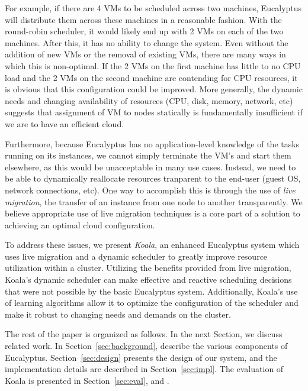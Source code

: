 For example, if there are 4 VMs to be scheduled across two machines, Eucalyptus will distribute them across these machines in a reasonable fashion.  With the round-robin scheduler, it would likely end up with 2 VMs on each of the two machines.  After this, it has no ability to change the system.  Even without the addition of new VMs or the removal of existing VMs, there are many ways in which this is non-optimal.  If the 2 VMs on the first machine has little to no CPU load and the 2 VMs on the second machine are contending for CPU resources, it is obvious that this configuration could be improved.  More generally, the dynamic needs and changing availability of resources (CPU, disk, memory, network, etc) suggests that assignment of VM to nodes statically is fundamentally insufficient if we are to have an efficient cloud.

Furthermore, because Eucalyptus has no application-level knowledge of the tasks running on its instances, we cannot simply terminate the VM's and start them elsewhere, as this would be unacceptable in many use cases.  Instead, we need to be able to dynamically reallocate resources tranparent to the end-user (guest OS, network connections, etc).  One way to accomplish this is through the use of \emph{live migration}, the transfer of an instance from one node to another transparently.  We believe appropriate use of live migration techniques is a core part of a solution to achieving an optimal cloud configuration.


To address these issues, we present \emph{Koala}, an enhanced Eucalyptus system which uses live migration and a dynamic scheduler to greatly improve resource utilization within a cluster.  Utilizing the benefits provided from live migration, Koala's dynamic scheduler can make effective and reactive scheduling decisions that were not possible by the basic Eucalyptus system.  Additionally, Koala's use of learning algorithms allow it to optimize the configuration of the scheduler and make it robust to changing needs and demands on the cluster.

The rest of the paper is organized as follows.  In the next Section, we discuss related work.  In Section~\ref{sec:background}, describe the various components of Eucalyptus.  Section~\ref{sec:design} presents the design of our system, and the implementation details are described in Section~\ref{sec:impl}.  The evaluation of Koala is presented in Section~\ref{sec:eval}, and .
